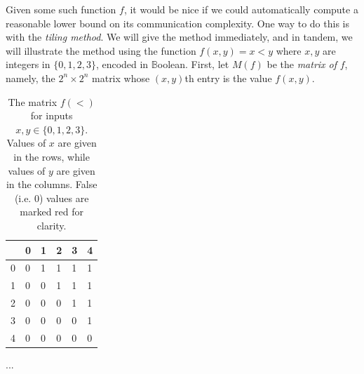 \documentclass[12pt]{article}
\begin{document}
Given some such function $f$, it would be nice if we could automatically compute
a reasonable lower bound on its communication complexity.
One way to do this is with the \emph{tiling method}.
We will give the method immediately, and in tandem, we will illustrate the method using
the function $f(x, y) = x < y$ where $x, y$ are integers in $\{ 0, 1, 2, 3 \}$, encoded in $\mathbb{B}$oolean.
First, let $M(f)$ be the \emph{matrix of }$f$,
	namely,
		the $2^n \times 2^n$ matrix whose $(x, y)$th entry
		is the value $f(x, y)$.
\begin{table}[h]
\centering
\begin{tabular}{|l|lllll|}
\hline
    & 0 & 1 & 2 & 3 & 4 \\\hline
0   & \cellcolor{red!25}0 & \cellcolor{green!25}1 & \cellcolor{green!25}1 & \cellcolor{green!25}1 & \cellcolor{green!25}1 \\
1   & \cellcolor{red!25}0 & \cellcolor{red!25}0 & \cellcolor{green!25}1 & \cellcolor{green!25}1 & \cellcolor{green!25}1 \\
2   & \cellcolor{red!25}0 & \cellcolor{red!25}0 & \cellcolor{red!25}0 & \cellcolor{green!25}1 & \cellcolor{green!25}1 \\
3   & \cellcolor{red!25}0 & \cellcolor{red!25}0 & \cellcolor{red!25}0 & \cellcolor{red!25}0 & \cellcolor{green!25}1 \\
4   & \cellcolor{red!25}0 & \cellcolor{red!25}0 & \cellcolor{red!25}0 & \cellcolor{red!25}0 & \cellcolor{red!25}0\\\hline
\end{tabular}
\caption{The matrix $f(<)$ for inputs $x, y \in \{ 0, 1, 2, 3 \}$.  Values of $x$ are given in the rows, while values of $y$ are given in the columns.  False (i.e. 0) values are marked red for clarity.}
\end{table}

\TODO ...

% 
% 
\end{document}
